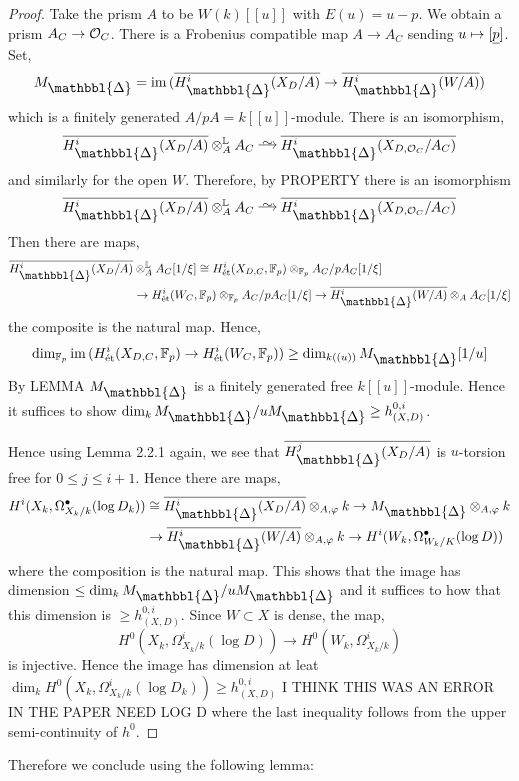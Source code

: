 \documentclass[12pt]{article}
\newcommand{\Prism}{{\mathlarger{\mathbbl{\Delta}}}}
\begin{document}
\begin{proof}
Take the prism $A$ to be $W(k)[[u]]$ with $E(u) = u - p$. We obtain a prism $A_C \to \mathcal{O}_C$. There is a Frobenius compatible map $A \to A_C$ sending $u \mapsto [\underline{p}]$. Set,
\[ M_{\Prism} = \im{(\ol{H^i_{\Prism}(X_D/A)} \to \ol{H^i_{\Prism}(W/A)})} \]
which is a finitely generated $A / pA = k[[u]]$-module. There is an isomorphism,
\[ \ol{H^i_{\Prism}(X_D/A)} \ot_A^{\LL} A_C \iso \ol{H^i_{\Prism}(X_{D, \cO_C}/A_C)} \]
and similarly for the open $W$. Therefore, by {\color{red} PROPERTY} there is an isomorphism
\[ \ol{H^i_{\Prism}(X_D/A)} \ot_A^{\LL} A_C \iso \ol{H^i_{\Prism}(X_{D, \cO_C}/A_C)} \]
Then there are maps,
\begin{align*}
\ol{H^i_{\Prism}(X_D/A)} & \ot_A^{\LL} A_C [1/\xi] \cong H^i_{\et}(X_{D,C}, \FF_p) \ot_{\FF_p} A_C / p A_C [1/\xi]
\\
& \to H^i_{\et}(W_C, \FF_p) \ot_{\FF_p} A_C / p A_C[1/\xi] \to \ol{H^i_{\Prism}(W/A)} \ot_A A_C[1/\xi] 
\end{align*}
the composite is the natural map. Hence,
\[ \dim_{\FF_p} \im{(H^i_{\et}(X_{D,C}, \FF_p) \to H^i_{\et}(W_C, \FF_p))} \ge \dim_{k((u))} M_{\Prism}[1/u] \]
By {\color{red} LEMMA} $M_{\Prism}$ is a finitely generated free $k[[u]]$-module. Hence it suffices to show $\dim_k M_{\Prism} / u M_{\Prism} \ge h^{0,i}_{(X,D)}$. 


Hence using Lemma 2.2.1 again, we see that $\ol{H^j_{\Prism}(X_D/A)}$ is $u$-torsion free for $0 \le j \le i + 1$. Hence there are maps,
\begin{align*}
H^i(X_k, \Omega^\bullet_{X_k/k}(\log{D_k})) & \cong \ol{H^i_{\Prism}(X_D/A)} \ot_{A, \varphi} k \to M_{\Prism} \ot_{A, \varphi} k 
\\
& \to \ol{H^i_{\Prism}(W/A)} \ot_{A, \varphi} k \to H^i(W_k, \Omega^\bullet_{W_k/K}(\log{D})) 
\end{align*}
where the composition is the natural map. This shows that the image has dimension $\le \dim_k M_{\Prism} / u M_{\Prism}$ and it suffices to how that this dimension is $\ge h^{0,i}_{(X,D)}$. Since $W \subset X$ is dense, the map,
\[ H^0(X_k, \Omega^i_{X_k/k}(\log{D})) \to H^0(W_k, \Omega^i_{X_k/k}) \]
is injective. Hence the image has dimension at leat $\dim_k H^0(X_k, \Omega^i_{X_k/k}(\log{D_k})) \ge h^{0,i}_{(X,D)}$ {\color{red} I THINK THIS WAS AN ERROR IN THE PAPER NEED LOG D} where the last inequality follows from the upper semi-continuity of $h^0$. 
\end{proof}

Therefore we conclude using the following lemma:
\end{document}
